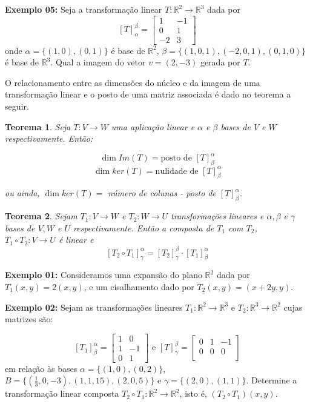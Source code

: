 \documentclass[oneside,a4paper,12pt]{article}
\newtheorem{theorem}{Teorema}[section]
\begin{document}
{\bf Exemplo 05:} Seja a transformação linear $T: \mathbb{R}^2 \rightarrow \mathbb{R}^3$ dada por
$$[T]_{\alpha}^{\beta} = \left[
\begin{array}{cc}
1	&	-1	\\
0	&	1	\\
-2	&	3
\end{array}
\right] 
$$
onde $\alpha = \{ (1,0), (0,1) \}$ é base de $\mathbb{R}^2$, $\beta = \{ (1,0,1), (-2,0,1), (0,1,0) \}$ é base de $\mathbb{R}^3$. Qual a imagem do vetor $v = (2,-3)$ gerada por $T$.
\vspace{150pt}

O relacionamento entre as dimensões do núcleo e da imagem de uma transformação linear e o posto de uma matriz associada é dado no teorema a seguir.

\begin{theorem}
	Seja $T:V \rightarrow W$ uma aplicação linear e $\alpha$ e $\beta$ bases de $V$ e $W$ respectivamente. Então:
	
	$$\dim Im(T) =  \text{posto de } [T]_{\beta}^{\alpha}$$
	$$\dim ker(T) = \text{nulidade de } [T]_{\beta}^{\alpha}$$
	
	ou ainda, $\dim ker(T) = $ número de colunas - posto de $[T]_{\beta}^{\alpha}$.
\end{theorem}

\begin{theorem}
	Sejam $T_1 : V \rightarrow W$ e $T_2 : W \rightarrow U$ transformações lineares e $\alpha, \beta$ e $\gamma$ bases de $V, W$ e $U$ respectivamente. Então a composta de $T_1$ com $T_2$, $T_1 \circ T_2: V \rightarrow U$ é linear e
	$$[T_2 \circ T_1]_{\gamma}^{\alpha} = [T_2]_{\gamma}^{\beta} \cdot [T_1]_{\beta}^{\alpha}$$
	\vspace{100pt}
\end{theorem}

{\bf Exemplo 01: } Consideramos uma expansão do plano $\mathbb{R}^2$ dada por $T_1(x,y) = 2(x,y)$, e um cisalhamento dado por $T_2(x,y) = (x+2y,y)$.
\vspace{300pt}

{\bf Exemplo 02: } Sejam as transformações lineares $T_1: \mathbb{R}^2 \rightarrow \mathbb{R}^3$ e $T_2: \mathbb{R}^3 \rightarrow \mathbb{R}^2$ cujas matrizes são:

$$[T_1]_{\beta}^{\alpha} = \left[
\begin{array}{cc}
1	&	0	\\
1	&	-1	\\
0	&	1
\end{array}
\right] 
\text{ e }
[T]_{\gamma}^{\beta} = \left[
\begin{array}{ccc}
	0	&	1	&	-1	\\
	0	&	0	&	0	\\
\end{array}
\right] 
$$
em relação às bases $\alpha = \{ (1,0), (0,2) \}$, $B = \{ (\frac{1}{3},0,-3), (1,1,15), (2,0,5) \}$ e $\gamma = \{ (2,0), (1,1) \}$. Determine a transformação linear composta $T_2 \circ T_1: \mathbb{R}^2 \rightarrow \mathbb{R}^2$, isto é, $(T_2 \circ T_1)(x,y)$.
\vspace{300pt}
\end{document}
